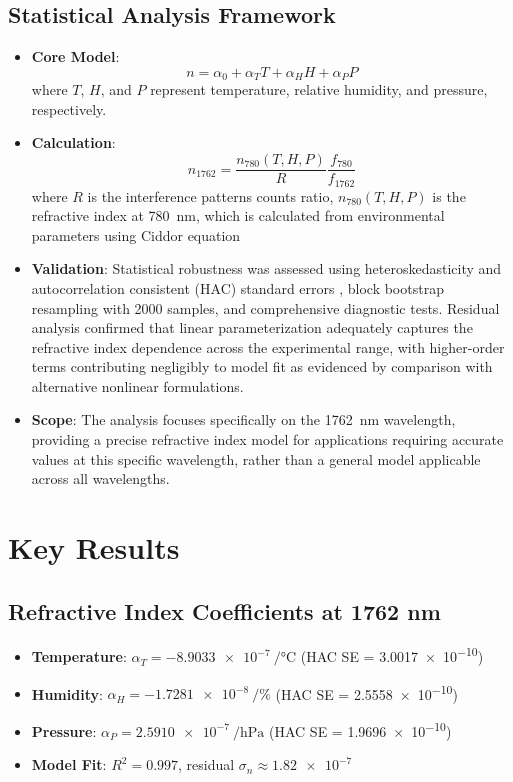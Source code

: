 \documentclass[aip,reprint,groupedaddress,onecolumn,superscriptaddress]{revtex4-2}
\begin{document}
\subsection{Statistical Analysis Framework}
\begin{itemize}
    \item \textbf{Core Model}: $$n = \alpha_0 + \alpha_T T + \alpha_H H + \alpha_P P$$
    where $T$, $H$, and $P$ represent temperature, relative humidity, and pressure, respectively.
    \item \textbf{Calculation}: $$n_{1762} = \frac{n_{780}(T,H,P)}{R} \frac{f_{780}}{f_{1762}}$$
    where $R$ is the interference patterns counts ratio, $n_{780}(T,H,P)$ is the refractive index at \SI{780}{\nano\meter}, which is calculated from environmental parameters using Ciddor equation \cite{ciddor1996refractive}
    \item \textbf{Validation}: Statistical robustness was assessed using heteroskedasticity and autocorrelation consistent (HAC) standard errors \cite{andrews1991heteroskedasticity}, block bootstrap resampling with \num{2000} samples, and comprehensive diagnostic tests. Residual analysis confirmed that linear parameterization adequately captures the refractive index dependence across the experimental range, with higher-order terms contributing negligibly to model fit as evidenced by comparison with alternative nonlinear formulations.
    \item \textbf{Scope}: The analysis focuses specifically on the \SI{1762}{\nano\meter} wavelength, providing a precise refractive index model for applications requiring accurate values at this specific wavelength, rather than a general model applicable across all wavelengths.
\end{itemize}


\section{Key Results}

\subsection{Refractive Index Coefficients at 1762 nm}
\begin{itemize}
    \item \textbf{Temperature}: $\alpha_T = \SI{-8.9033e-7}{\per\degreeCelsius}$ (HAC SE = \num{3.0017e-10})
    \item \textbf{Humidity}: $\alpha_H = \SI{-1.7281e-8}{\per\percent}$ (HAC SE = \num{2.5558e-10})
    \item \textbf{Pressure}: $\alpha_P = \SI{+2.5910e-7}{\per\hecto\pascal}$ (HAC SE = \num{1.9696e-10})
    \item \textbf{Model Fit}: $R^2 = \num{0.997}$, residual $\sigma_n \approx \num{1.82e-7}$
\end{itemize}
\end{document}
